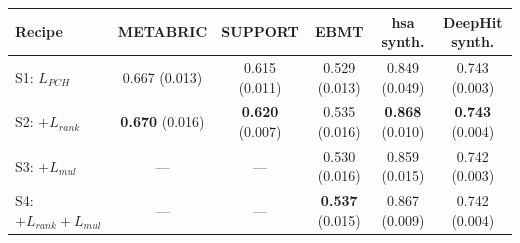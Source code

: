 \begin{tabular}{lccccc}
\toprule
Recipe & METABRIC & SUPPORT & EBMT & hsa synth. & DeepHit synth. \\
\midrule
S1: $L_{PCH}$ & 0.667 (0.013) & 0.615 (0.011) & 0.529 (0.013) & 0.849 (0.049) & 0.743 (0.003) \\
S2: $+L_{rank}$ & \textbf{0.670} (0.016) & \textbf{0.620} (0.007) & 0.535 (0.016) & \textbf{0.868} (0.010) & \textbf{0.743} (0.004) \\
S3: $+L_{mul}$ & --- & --- & 0.530 (0.016) & 0.859 (0.015) & 0.742 (0.003) \\
S4: $+L_{rank}+L_{mul}$ & --- & --- & \textbf{0.537} (0.015) & 0.867 (0.009) & 0.742 (0.004) \\
\bottomrule
\end{tabular}
